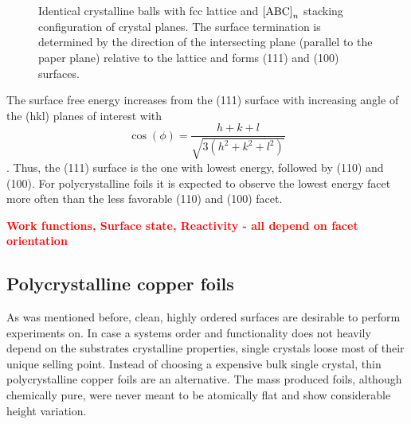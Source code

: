 \begin{figure}\centering
	 \quad
	\caption{Identical crystalline balls with fcc lattice and $\textnormal{[ABC]}_n$ stacking configuration of crystal planes. The surface termination is determined by the direction of the intersecting plane (parallel to the paper plane) relative to the lattice and forms (111) and (100) surfaces.}
	\label{fig:crystal-termination}
\end{figure}

The surface free energy increases from the (111) surface with increasing angle of the (hkl) planes of interest with $$\cos(\phi)=\frac{h+k+l}{\sqrt{3(h^2+k^2+l^2)}}$$ \cite{jian-min_calculation_2004}. Thus, the (111) surface is the one with lowest energy, followed by (110) and (100). For polycrystalline foils it is expected to observe the lowest energy facet more often than the less favorable (110) and (100) facet.

\textcolor{red}{\textbf{Work functions, Surface state, Reactivity - all depend on facet orientation}}

 \subsection{Polycrystalline copper foils}
 
  As was mentioned before, clean, highly ordered surfaces are desirable to perform experiments on. In case a systems order and functionality does not heavily depend on the substrates crystalline properties, single crystals loose most of their unique selling point. Instead of choosing a expensive bulk single crystal, thin polycrystalline copper foils are an alternative. The mass produced foils, although chemically pure, were never meant to be atomically flat and show considerable height variation.

